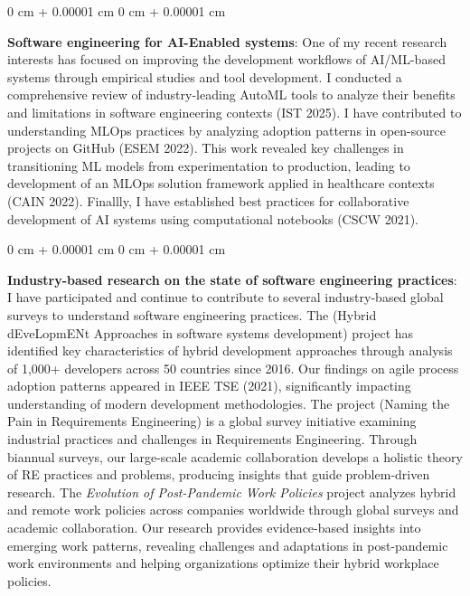 \documentclass[10pt, a4paper]{article}
\newenvironment{onecolentry}{
    \begin{adjustwidth}{
        0 cm + 0.00001 cm
    }{
        0 cm + 0.00001 cm
    }
}{
    \end{adjustwidth}
} %
\let\hrefWithoutArrow\href
\renewcommand{\href}[2]{\hrefWithoutArrow{#1}{\ifthenelse{\equal{#2}{}}{ }{#2 }\raisebox{.15ex}{\footnotesize \faExternalLink*}}}
\begin{document}
        \vspace{0.2 cm}

        \begin{onecolentry}
            \textbf{Software engineering for AI-Enabled systems}: One of my recent research interests has focused on improving the development workflows of AI/ML-based systems through empirical studies and tool development. I conducted a comprehensive review of industry-leading AutoML tools to analyze their benefits and limitations in software engineering contexts (IST 2025). I have contributed to understanding MLOps practices by analyzing adoption patterns in open-source projects on GitHub (ESEM 2022). This work revealed key challenges in transitioning ML models from experimentation to production, leading to development of an MLOps solution framework applied in healthcare contexts (CAIN 2022). Finallly, I have established best practices for collaborative development of AI systems using computational notebooks (CSCW 2021).
        \end{onecolentry}

        \vspace{0.2 cm}

        \begin{onecolentry}
            \textbf{Industry-based research on the state of software engineering practices}: I have participated and continue to contribute to several industry-based global surveys to understand software engineering practices. The \href{https://helenastudy.wordpress.com/helena-team}{\textit{HELENA}} (Hybrid dEveLopmENt Approaches in software systems development) project has identified key characteristics of hybrid development approaches through analysis of 1,000+ developers across 50 countries since 2016. Our findings on agile process adoption patterns appeared in IEEE TSE (2021), significantly impacting understanding of modern development methodologies. The \href{http://www.napire.org}{\textit{NaPiRE}} project (Naming the Pain in Requirements Engineering) is a global survey initiative examining industrial practices and challenges in Requirements Engineering. Through biannual surveys, our large-scale academic collaboration develops a holistic theory of RE practices and problems, producing insights that guide problem-driven research. The \textit{Evolution of Post-Pandemic Work Policies} project analyzes hybrid and remote work policies across companies worldwide through global surveys and academic collaboration. Our research provides evidence-based insights into emerging work patterns, revealing challenges and adaptations in post-pandemic work environments and helping organizations optimize their hybrid workplace policies.
        \end{onecolentry}
\end{document}
